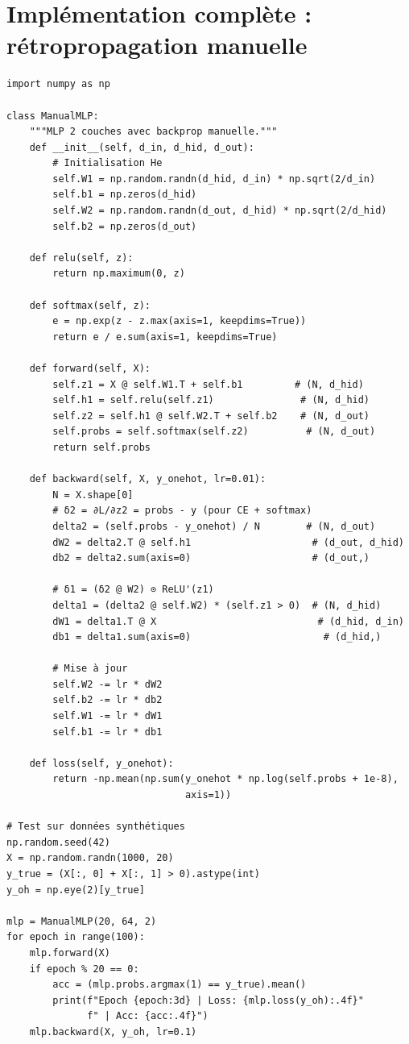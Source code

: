 \section{Impl\'ementation compl\`ete : r\'etropropagation manuelle}
\label{sec:backprop_manual}

\begin{codeblock}[title=\textbf{R\'etropropagation manuelle (sans autograd)}]
\begin{verbatim}
import numpy as np

class ManualMLP:
    """MLP 2 couches avec backprop manuelle."""
    def __init__(self, d_in, d_hid, d_out):
        # Initialisation He
        self.W1 = np.random.randn(d_hid, d_in) * np.sqrt(2/d_in)
        self.b1 = np.zeros(d_hid)
        self.W2 = np.random.randn(d_out, d_hid) * np.sqrt(2/d_hid)
        self.b2 = np.zeros(d_out)

    def relu(self, z):
        return np.maximum(0, z)

    def softmax(self, z):
        e = np.exp(z - z.max(axis=1, keepdims=True))
        return e / e.sum(axis=1, keepdims=True)

    def forward(self, X):
        self.z1 = X @ self.W1.T + self.b1         # (N, d_hid)
        self.h1 = self.relu(self.z1)               # (N, d_hid)
        self.z2 = self.h1 @ self.W2.T + self.b2    # (N, d_out)
        self.probs = self.softmax(self.z2)          # (N, d_out)
        return self.probs

    def backward(self, X, y_onehot, lr=0.01):
        N = X.shape[0]
        # δ2 = ∂L/∂z2 = probs - y (pour CE + softmax)
        delta2 = (self.probs - y_onehot) / N        # (N, d_out)
        dW2 = delta2.T @ self.h1                     # (d_out, d_hid)
        db2 = delta2.sum(axis=0)                     # (d_out,)

        # δ1 = (δ2 @ W2) ⊙ ReLU'(z1)
        delta1 = (delta2 @ self.W2) * (self.z1 > 0)  # (N, d_hid)
        dW1 = delta1.T @ X                            # (d_hid, d_in)
        db1 = delta1.sum(axis=0)                       # (d_hid,)

        # Mise à jour
        self.W2 -= lr * dW2
        self.b2 -= lr * db2
        self.W1 -= lr * dW1
        self.b1 -= lr * db1

    def loss(self, y_onehot):
        return -np.mean(np.sum(y_onehot * np.log(self.probs + 1e-8),
                               axis=1))

# Test sur données synthétiques
np.random.seed(42)
X = np.random.randn(1000, 20)
y_true = (X[:, 0] + X[:, 1] > 0).astype(int)
y_oh = np.eye(2)[y_true]

mlp = ManualMLP(20, 64, 2)
for epoch in range(100):
    mlp.forward(X)
    if epoch % 20 == 0:
        acc = (mlp.probs.argmax(1) == y_true).mean()
        print(f"Epoch {epoch:3d} | Loss: {mlp.loss(y_oh):.4f}"
              f" | Acc: {acc:.4f}")
    mlp.backward(X, y_oh, lr=0.1)
\end{verbatim}
\end{codeblock}

